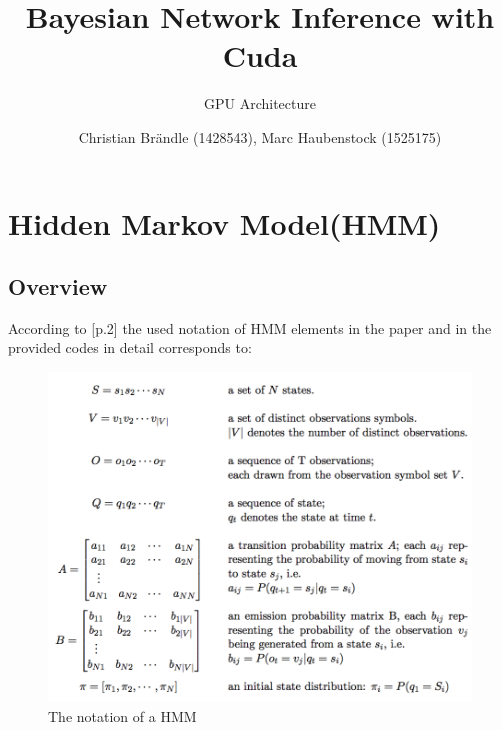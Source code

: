 \documentclass[english, paper=a4]{scrartcl}
\begin{document}
\graphicspath{{images/}}


\title{Bayesian Network Inference with Cuda} 

\subtitle{GPU Architecture} 

\author{Christian Brändle (1428543), Marc Haubenstock (1525175)}




\maketitle

\section{Hidden Markov Model(HMM)}

\subsection{Overview}



According to \cite{cuhmm}[p.2] the used notation of HMM elements in the paper and in the provided codes in detail corresponds to:

\begin{figure}[H]
\centering

\includegraphics[scale=0.4]{"symbols"}
  \caption{The notation of a HMM \cite{cuhmm}}
\end{figure}
\end{document}
